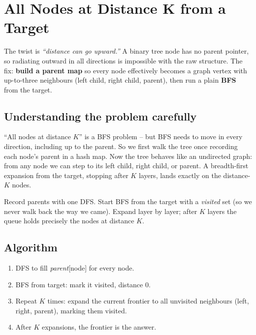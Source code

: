 \section{All Nodes at Distance K from a Target}
\label{sec:trees-distance-k}


\begin{patternbox}
The twist is \emph{``distance can go upward.''} A binary tree node has no
parent pointer, so radiating outward in all directions is impossible with
the raw structure. The fix: \textbf{build a parent map} so every node
effectively becomes a graph vertex with up-to-three neighbours (left
child, right child, parent), then run a plain \textbf{BFS} from the target.
\end{patternbox}

\subsection*{Understanding the problem carefully}

``All nodes at distance $K$'' is a BFS problem -- but BFS needs to move in
every direction, including up to the parent. So we first walk the tree
once recording each node's parent in a hash map. Now the tree behaves like
an undirected graph: from any node we can step to its left child, right
child, or parent. A breadth-first expansion from the target, stopping after
$K$ layers, lands exactly on the distance-$K$ nodes.

\begin{ideabox}
Record parents with one DFS. Start BFS from the target with a
\textit{visited} set (so we never walk back the way we came). Expand
layer by layer; after $K$ layers the queue holds precisely the nodes at
distance $K$.
\end{ideabox}

\subsection*{Algorithm}

\begin{enumerate}
  \item DFS to fill \textit{parent}[node] for every node.
  \item BFS from target: mark it visited, distance $0$.
  \item Repeat $K$ times: expand the current frontier to all unvisited
        neighbours (left, right, parent), marking them visited.
  \item After $K$ expansions, the frontier is the answer.
\end{enumerate}

